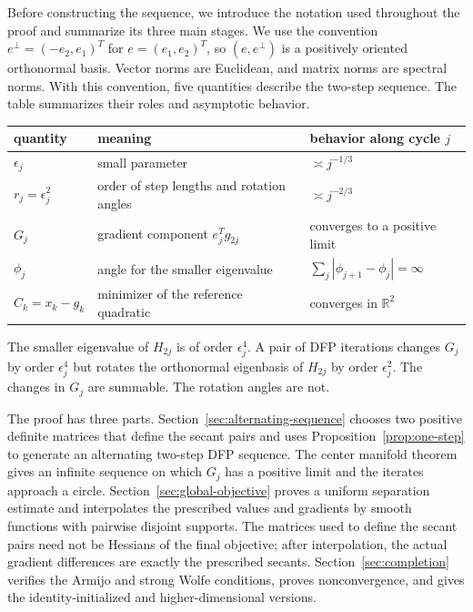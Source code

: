 \documentclass[11pt]{article}
\newcommand{\R}{\mathbb R}
\begin{document}
Before constructing the sequence, we introduce the notation used
throughout the proof and summarize its three main stages.  We use the
convention $e^\perp=(-e_2,e_1)^T$ for
$e=(e_1,e_2)^T$, so $(e,e^\perp)$ is a positively oriented orthonormal
basis.  Vector norms are Euclidean, and matrix norms are spectral norms.  With
this convention, five quantities describe the two-step sequence.  The table summarizes their
roles and asymptotic behavior.
\begin{center}
\small
\begin{tabular}{@{}lll@{}}
\toprule
quantity & meaning & behavior along cycle $j$\\
\midrule
$\epsilon_j$ & small parameter & $\asymp j^{-1/3}$\\
$r_j=\epsilon_j^2$ & order of step lengths and rotation angles & $\asymp j^{-2/3}$\\
$G_j$ & gradient component $e_j^Tg_{2j}$ & converges to a positive limit\\
$\phi_j$ & angle for the smaller eigenvalue
  & $\sum_j|\phi_{j+1}-\phi_j|=\infty$\\
$C_k=x_k-g_k$ & minimizer of the reference quadratic & converges in $\R^2$\\
\bottomrule
\end{tabular}
\end{center}
The smaller eigenvalue of $H_{2j}$ is of order $\epsilon_j^4$.  A pair of DFP
iterations changes $G_j$ by order $\epsilon_j^4$ but rotates the orthonormal
eigenbasis of $H_{2j}$ by order $\epsilon_j^2$.  The changes in $G_j$ are
summable.  The rotation angles are not.

The proof has three parts.  Section~\ref{sec:alternating-sequence} chooses two
positive definite matrices that define the secant pairs and uses
Proposition~\ref{prop:one-step} to generate an alternating
two-step DFP sequence.  The center manifold theorem gives an infinite
sequence on which $G_j$ has a positive limit and the iterates approach a
circle.  Section~\ref{sec:global-objective} proves a uniform separation
estimate and interpolates the prescribed values and gradients by
smooth functions with pairwise disjoint supports.  The matrices used to define
the secant pairs need not be Hessians of the final objective; after
interpolation, the actual gradient differences are exactly the prescribed
secants.  Section~\ref{sec:completion} verifies the Armijo and strong Wolfe
conditions, proves nonconvergence, and gives the identity-initialized and
higher-dimensional versions.
\end{document}
